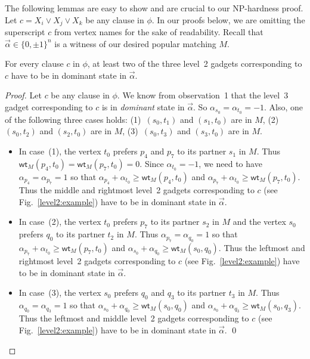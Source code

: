 \documentclass{llncs}
\newcommand{\wt}{\mathsf{wt}}
\begin{document}
The following lemmas are easy to show and are crucial to our NP-hardness proof. Let $c = X_i \vee X_j \vee X_k$ be any clause in $\phi$.
In our proofs below, we are omitting the superscript $c$ from vertex names for the sake of readability. Recall that $\vec{\alpha} \in \{0, \pm 1\}^n$ is a witness of
our desired popular matching $M$. 
\begin{lemma}
  \label{lemma1}
    For every clause $c$ in $\phi$, at least two of the three level~2 gadgets corresponding to $c$ have to be in dominant state in $\vec{\alpha}$.
\end{lemma}
\begin{proof}
  Let $c$ be any clause in $\phi$.
  We know from observation~1 that the level~3 gadget corresponding to $c$ is in {\em dominant} state in $\vec{\alpha}$. So $\alpha_{s_0} = \alpha_{t_0} = -1$.
  Also, one of the following three cases holds: (1)~$(s_0,t_1)$ and $(s_1,t_0)$ are in $M$, (2)~$(s_0,t_2)$ and $(s_2,t_0)$ are in $M$,
  (3)~$(s_0,t_3)$ and $(s_3,t_0)$ are in $M$.
  
  \begin{itemize}
  \item In case~(1), the vertex $t_0$ prefers $p_4$ and $p_7$ to its partner $s_1$ in $M$. Thus $\wt_M(p_4,t_0) = \wt_M(p_7,t_0) = 0$.
    Since $\alpha_{t_0} = -1$, we need to have $\alpha_{p_4} = \alpha_{p_7} = 1$ so that $\alpha_{p_4} + \alpha_{t_0} \ge \wt_M(p_4,t_0)$ and
    $\alpha_{p_7} + \alpha_{t_0} \ge \wt_M(p_7,t_0)$. Thus the middle and rightmost level~2 gadgets corresponding to $c$
  (see Fig.~\ref{level2:example}) have to be in dominant state in $\vec{\alpha}$.

  \item In case~(2), the vertex $t_0$ prefers $p_7$ to its partner $s_2$ in $M$ and the vertex $s_0$ prefers $q_0$ to its partner $t_2$ in $M$.
    Thus $\alpha_{p_7} = \alpha_{q_0} = 1$ so that $\alpha_{p_7} + \alpha_{t_0} \ge \wt_M(p_7,t_0)$ and $\alpha_{s_0} + \alpha_{q_0} \ge \wt_M(s_0,q_0)$.
    Thus the leftmost and rightmost level~2 gadgets corresponding to $c$ (see Fig.~\ref{level2:example}) have to be in dominant state in $\vec{\alpha}$.

  \item In case~(3), the vertex $s_0$ prefers $q_0$ and $q_3$ to its partner $t_3$ in $M$.
    Thus $\alpha_{q_0} = \alpha_{q_3} = 1$ so that $\alpha_{s_0} + \alpha_{q_0} \ge \wt_M(s_0,q_0)$ and $\alpha_{s_0} + \alpha_{q_3} \ge \wt_M(s_0,q_3)$.
    Thus the leftmost and middle level~2 gadgets corresponding to $c$ (see Fig.~\ref{level2:example}) have to be in dominant state in $\vec{\alpha}$. \qed
  \end{itemize}
\end{proof}  
\end{document}
